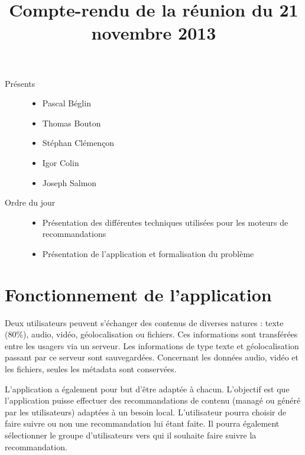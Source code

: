 \documentclass[a4paper]{article}
\title{Compte-rendu de la r\'eunion du 21 novembre 2013}
\author{}
\date{}
\begin{document}
\maketitle

\begin{description}
    \item[Pr\'esents]\hfill
        \begin{itemize}
            \item Pascal B\'eglin
            \item Thomas Bouton
            \item St\'ephan Cl\'emençon
            \item Igor Colin
            \item Joseph Salmon
        \end{itemize}
    \item[Ordre du jour]\hfill
        \begin{itemize}
            \item Pr\'esentation des diff\'erentes techniques utilis\'ees pour
                les moteurs de recommandations
            \item Pr\'esentation de l'application et formalisation du problème
        \end{itemize}
\end{description}

\section{Fonctionnement de l'application}
Deux utilisateurs peuvent s'\'echanger des contenus de diverses natures :
texte (80\%), audio, vid\'eo, g\'eolocalisation ou fichiers.
Ces informations sont transf\'er\'ees entre les usagers via un serveur.
Les informations de type texte et g\'eolocalisation passant
par ce serveur sont sauvegard\'ees. Concernant les donn\'ees audio, vid\'eo et
les fichiers, seules les m\'etadata sont conserv\'ees.

L'application a \'egalement pour but d'être adapt\'ee à chacun. L'objectif est
que l'application puisse effectuer des recommandations de contenu (manag\'e ou
g\'en\'er\'e par les utilisateurs) adapt\'ees à un besoin local. L'utilisateur
pourra choisir de faire suivre ou non une recommandation lui \'etant faite. Il
pourra \'egalement s\'electionner le groupe d'utilisateurs vers qui il souhaite
faire suivre la recommandation.
\end{document}
